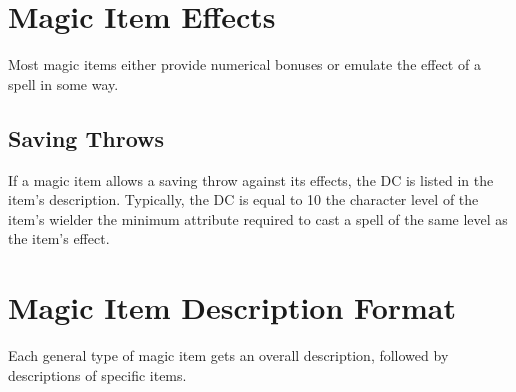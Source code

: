 \section{Magic Item Effects}
Most magic items either provide numerical bonuses or emulate the effect of a spell in some way.

\subsection{Saving Throws}

If a magic item allows a saving throw against its effects, the DC is listed in the item's description. Typically, the DC is equal to 10 \add the character level of the item's wielder \add the minimum attribute required to cast a spell of the same level as the item's effect.

\begin{comment}
\subsection{Charges, Doses, and Multiple Uses}

Many items, particularly wands and staffs, are limited in power by the number of charges they hold. Normally, charged items have 50 charges at most. If such an item is found as a random part of a treasure, roll d\% and divide by 2 to determine the number of charges left (round down, minimum 1). If the item has a maximum number of charges other than 50, roll randomly to determine how many charges are left.

Prices listed are always for fully charged items. (When an item is created, it is fully charged.) An item with no charges left is worth half the price of a fully charged item. For an item that's worthless when its charges run out (which is the case for almost all charged items), the value of the partially used item is proportional to the number of charges left. For an item that has usefulness in addition to its charges, only part of the item's value is based on the number of charges left.
\end{comment}

\section{Magic Item Description Format}

Each general type of magic item gets an overall description, followed by descriptions of specific items.

